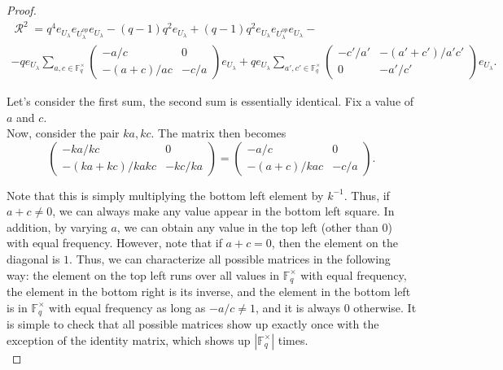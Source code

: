 \documentclass[12pt,reqno]{amsart}
\theoremstyle{definition}
\theoremstyle{remark}
\numberwithin{equation}{section}
\DeclareMathOperator{\R}{\mathcal{R}}
\begin{document}
\begin{proof}
\begin{multline*}
    \R^2 =  q^4e_{U_{\lambda}}e_{U_{\lambda}^{op}}e_{U_{\lambda}} -  (q-1) q^2e_{U_{\lambda}} +  (q-1) q^2e_{U_{\lambda}}e_{U_{\lambda}^{op}}e_{U_{\lambda}}-\\
    - qe_{U_{\lambda}} \sum_{a, c \in \mathbb{F}_q^{\times}}\begin{pmatrix}
    -a/c & 0 \\
    -(a+c)/ac & -c/a 
    \end{pmatrix} e_{U_{\lambda}}
    + qe_{U_{\lambda}} \sum_{a', c' \in \mathbb{F}_q^{\times}}
    \begin{pmatrix}
    -c'/a' & -(a'+c')/a'c' \\
    0 & -a'/c' 
    \end{pmatrix} e_{U_{\lambda}}.
\end{multline*}

Let's consider the first sum, the second sum is essentially identical. Fix a value of $a$ and $c$.\\

Now, consider the pair $ka, kc$. The matrix then becomes 
\begin{equation*}
    \begin{pmatrix}
-ka/kc & 0 \\
-(ka+kc)/kakc & -kc/ka 
\end{pmatrix} = \begin{pmatrix}
-a/c & 0 \\
-(a+c)/kac & -c/a 
\end{pmatrix}.    
\end{equation*}

Note that this is simply multiplying the bottom left element by $k^{-1}$. Thus, if $a+c \ne 0$, we can always make any value appear in the bottom left square. In addition, by varying $a$, we can obtain any value in the top left (other than $0$) with equal frequency. However, note that if $a+c = 0$, then the element on the diagonal is $1$. Thus, we can characterize all possible matrices in the following way: the element on the top left runs over all values in $\mathbb{F}_q^{\times}$ with equal frequency, the element in the bottom right is its inverse, and the element in the bottom left is in $\mathbb{F}_q^{\times}$ with equal frequency as long as $-a/c \ne 1$, and it is always $0$ otherwise. It is simple to check that all possible matrices show up exactly once with the exception of the identity matrix, which shows up $|\mathbb{F}_q^\times|$ times.\\


\end{proof}
\end{document}
